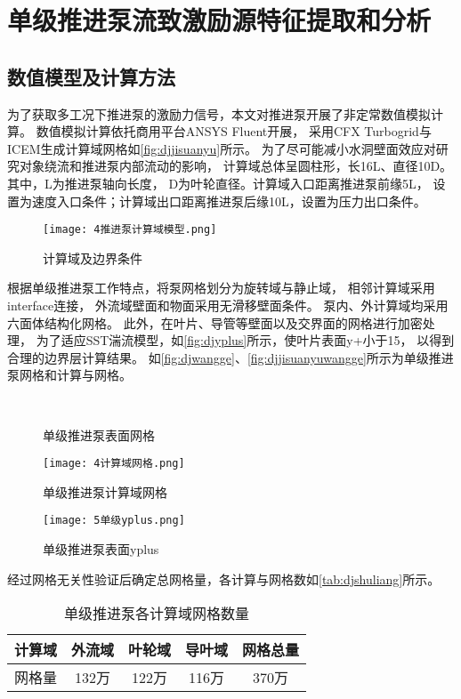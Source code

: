 \section{单级推进泵流致激励源特征提取和分析}
\subsection{数值模型及计算方法}
为了获取多工况下推进泵的激励力信号，本文对推进泵开展了非定常数值模拟计算。
数值模拟计算依托商用平台ANSYS Fluent开展，
采用CFX Turbogrid与ICEM生成计算域网格如\autoref{fig:djjisuanyu}所示。
为了尽可能减小水洞壁面效应对研究对象绕流和推进泵内部流动的影响，
计算域总体呈圆柱形，长16L、直径10D。其中，L为推进泵轴向长度，
D为叶轮直径。计算域入口距离推进泵前缘5L，
设置为速度入口条件；计算域出口距离推进泵后缘10L，设置为压力出口条件。
\begin{figure}[htbp]
    \centering
    \texttt{[image: 4推进泵计算域模型.png]}
    \caption{\label{fig:djjisuanyu}计算域及边界条件}
\end{figure}

根据单级推进泵工作特点，将泵网格划分为旋转域与静止域，
相邻计算域采用interface连接，
外流域壁面和物面采用无滑移壁面条件。
泵内、外计算域均采用六面体结构化网格。
此外，在叶片、导管等壁面以及交界面的网格进行加密处理，
为了适应SST湍流模型，如\autoref{fig:djyplus}所示，使叶片表面y+小于15，
以得到合理的边界层计算结果。
如\autoref{fig:djwangge}、\autoref{fig:djjisuanyuwangge}所示为单级推进泵网格和计算与网格。
\begin{figure}[htbp]
    \centering
    \vspace{0.02cm}
    \caption{\label{fig:djwangge}单级推进泵表面网格}
\end{figure}

\begin{figure}[htbp]
    \centering
    \texttt{[image: 4计算域网格.png]}
    \caption{\label{fig:djjisuanyuwangge}单级推进泵计算域网格}
\end{figure}

\begin{figure}[htbp]
    \centering
    \texttt{[image: 5单级yplus.png]}
    \caption{\label{fig:djyplus}单级推进泵表面yplus}
\end{figure}

经过网格无关性验证后确定总网格量，各计算与网格数如\autoref{tab:djshuliang}所示。
\begin{table}[htbp]
    \centering
    \caption{\label{tab:djshuliang}单级推进泵各计算域网格数量}
    \begin{tabular}{ccccc}
        \toprule
        计算域 & 外流域 & 叶轮域 & 导叶域  & 网格总量 \\
        \midrule
        网格量 & 132万 & 122万 & 116万 & 370万 \\
        \bottomrule
    \end{tabular}
\end{table}

